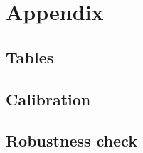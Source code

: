\documentclass{SelfArx}
\begin{document}
\printbibliography


\appendix
\section{Appendix}
\label{sec:org12bda4b}
\label{Ch_super_appen:A}

\subsection{Tables}
\label{sec:orgae5b5b1}





\subsection{Calibration}
\label{sec:orgc62df85}

\subsection{Robustness check}
\label{sec:org4fddbc8}
\end{document}
